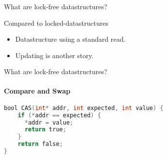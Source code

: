 \begin{frame}{What are lock-free datastructures?}
	\begin{block}{Compared to locked-datastructures}
		\begin{itemize}
			\item Datastructure using a standard \textcolor{ReneOrange}{read}.
			\item \textcolor{ReneOrange}{Updating} is another story.
		\end{itemize}
	\end{block}
\end{frame}

\begin{frame}[fragile]{What are lock-free datastructures?}
\framesubtitle{Compare and Swap}
\begin{lstlisting}[language=C,breaklines=true]
bool CAS(int* addr, int expected, int value) {
	if (*addr == expected) {
	  *addr = value;
	  return true;
	}
	return false;
} 
\end{lstlisting}
\end{frame}

